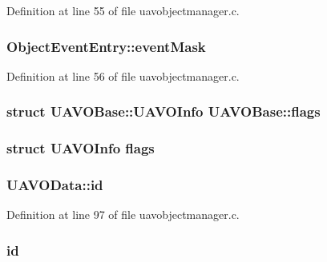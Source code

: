 Definition at line 55 of file uavobjectmanager.\-c.

\hypertarget{group___u_a_v_ga7943bff77f5f644659a1cb59d7f0b176}{
\subsubsection[{event\-Mask}]{ Object\-Event\-Entry\-::event\-Mask}}\label{group___u_a_v_ga7943bff77f5f644659a1cb59d7f0b176}


Definition at line 56 of file uavobjectmanager.\-c.

\hypertarget{group___u_a_v_ga613d564f9ee891c00dba4e3fe6277193}{
\subsubsection[{flags}]{\setlength{\rightskip}{0pt plus 5cm}struct {\bf U\-A\-V\-O\-Base\-::\-U\-A\-V\-O\-Info}  U\-A\-V\-O\-Base\-::flags}}\label{group___u_a_v_ga613d564f9ee891c00dba4e3fe6277193}
\hypertarget{group___u_a_v_ga89997860157be94711355010fc2a337d}{
\subsubsection[{flags}]{\setlength{\rightskip}{0pt plus 5cm}struct {\bf U\-A\-V\-O\-Info}  flags}}\label{group___u_a_v_ga89997860157be94711355010fc2a337d}
\hypertarget{group___u_a_v_gaead38a840ec3156c37871e121c202e40}{
\subsubsection[{id}]{ U\-A\-V\-O\-Data\-::id}}\label{group___u_a_v_gaead38a840ec3156c37871e121c202e40}


Definition at line 97 of file uavobjectmanager.\-c.

\hypertarget{group___u_a_v_gabaabdc509cdaba7df9f56c6c76f3ae19}{
\subsubsection[{id}]{ id}}\label{group___u_a_v_gabaabdc509cdaba7df9f56c6c76f3ae19}


